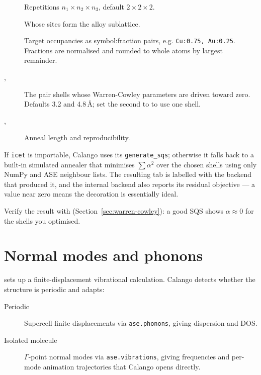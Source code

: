 \begin{description}
  \item[] Repetitions $n_1 \times n_2 \times n_3$, default
    $2 \times 2 \times 2$.
  \item[] Whose sites form the alloy sublattice.
  \item[] Target occupancies as symbol:fraction pairs, e.g.
    \texttt{Cu:0.75, Au:0.25}. Fractions are normalised and rounded to
    whole atoms by largest remainder.
  \item[, ] The pair shells
    whose Warren-Cowley parameters are driven toward zero. Defaults 3.2 and
    4.8\,\AA; set the second to  to use one shell.
  \item[, ] Anneal length and reproducibility.
\end{description}

If \texttt{icet} is importable, Calango uses its \texttt{generate\_sqs};
otherwise it falls back to a built-in simulated annealer that minimises
$\sum \alpha^2$ over the chosen shells using only NumPy and ASE neighbour
lists. The resulting tab is labelled with the backend that produced it, and
the internal backend also reports its residual objective --- a value near
zero means the decoration is essentially ideal.

\begin{caltip}
Verify the result with \menusep{}
(Section~\ref{sec:warren-cowley}): a good SQS shows $\alpha \approx 0$ for
the shells you optimised.
\end{caltip}

\section{Normal modes and phonons}
\label{sec:phonon-builder}

\menusep{} sets up a
finite-displacement vibrational calculation. Calango detects whether the
structure is periodic and adapts:

\begin{description}
  \item[Periodic] Supercell finite displacements via \texttt{ase.phonons},
    giving dispersion and DOS.
  \item[Isolated molecule] $\Gamma$-point normal modes via
    \texttt{ase.vibrations}, giving frequencies and per-mode animation
    trajectories that Calango opens directly.
\end{description}

